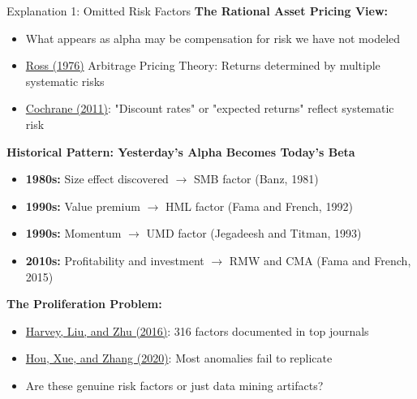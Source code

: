 \documentclass{beamer}
\begin{document}
\begin{frame}[allowframebreaks]{Explanation 1: Omitted Risk Factors}
    \textbf{The Rational Asset Pricing View:}
    \begin{itemize}
        \item What appears as alpha may be compensation for risk we have not modeled
        \item \textcolor{blue}{\href{https://doi.org/10.1016/0022-0531(76)90046-6}{Ross (1976)}} Arbitrage Pricing Theory: Returns determined by multiple systematic risks
        \item \textcolor{blue}{\href{https://onlinelibrary.wiley.com/doi/10.1111/j.1540-6261.2011.01671.x}{Cochrane (2011)}}: "Discount rates" or "expected returns" reflect systematic risk
    \end{itemize}

    \textbf{Historical Pattern: Yesterday's Alpha Becomes Today's Beta}
    \begin{itemize}
        \item \textbf{1980s:} Size effect discovered $\rightarrow$ SMB factor (Banz, 1981)
        \item \textbf{1990s:} Value premium $\rightarrow$ HML factor (Fama and French, 1992)
        \item \textbf{1990s:} Momentum $\rightarrow$ UMD factor (Jegadeesh and Titman, 1993)
        \item \textbf{2010s:} Profitability and investment $\rightarrow$ RMW and CMA (Fama and French, 2015)
    \end{itemize}
    
    \vspace{1cm}
    \textbf{The Proliferation Problem:}
    \begin{itemize}
        \item \textcolor{blue}{\href{https://doi.org/10.1093/rfs/hhv059}{Harvey, Liu, and Zhu (2016)}}: 316 factors documented in top journals
        \item \textcolor{blue}{\href{https://doi.org/10.1093/rfs/hhy131}{Hou, Xue, and Zhang (2020)}}: Most anomalies fail to replicate
        \item Are these genuine risk factors or just data mining artifacts?
    \end{itemize}
\end{frame}
\end{document}
